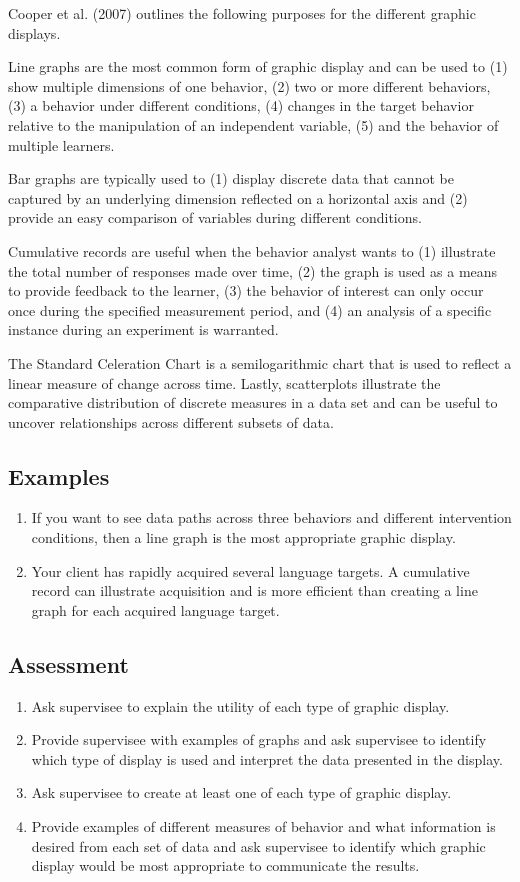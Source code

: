 Cooper et al. (2007) outlines the following purposes for the different graphic displays.  

Line graphs are the most common form of graphic display and can be used to (1) show multiple dimensions of one behavior, (2) two or more different behaviors, (3) a behavior under different conditions, (4) changes in the target behavior relative to the manipulation of an independent variable, (5) and the behavior of multiple learners. 

Bar graphs are typically used to (1) display discrete data that cannot be captured by an underlying dimension reflected on a horizontal axis and (2) provide an easy comparison of variables during different conditions. 

Cumulative records are useful when the behavior analyst wants to (1) illustrate the total number of responses made over time, (2) the graph is used as a means to provide feedback to the learner, (3) the behavior of interest can only occur once during the specified measurement period, and (4) an analysis of a specific instance during an experiment is warranted.

The Standard Celeration Chart is a semilogarithmic chart that is used to reflect a linear measure of change across time.  Lastly, scatterplots illustrate the comparative distribution of discrete measures in a data set and can be useful to uncover relationships across different subsets of data.
%
\subsection{Examples}
\begin{enumerate}
\item If you want to see data paths across three behaviors and different intervention conditions, then a line graph is the most appropriate graphic display.
\item Your client has rapidly acquired several language targets.  A cumulative record can illustrate acquisition and is more efficient than creating a line graph for each acquired language target.
%
\end{enumerate}
%
\subsection{Assessment}
\begin{enumerate}
\item Ask supervisee to explain the utility of each type of graphic display.
\item Provide supervisee with examples of graphs and ask supervisee to identify which type of display is used and interpret the data presented in the display.
\item Ask supervisee to create at least one of each type of graphic display.
\item Provide examples of different measures of behavior and what information is desired from each set of data and ask supervisee to identify which graphic display would be most appropriate to communicate the results.
%
\end{enumerate}
%
